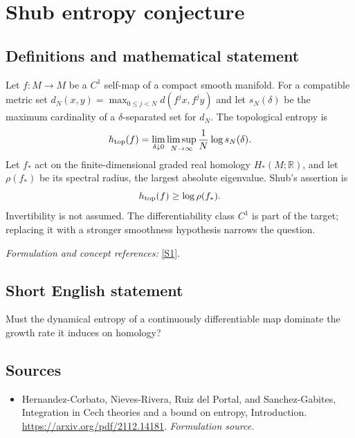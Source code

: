 \documentclass[11pt]{article}
\begin{document}
\section*{\texorpdfstring{Shub entropy conjecture}{Shub entropy conjecture}}\label{30006940}
\subsection{Definitions and mathematical statement}
Let $f:M\to M$ be a $C^1$ self-map of a compact smooth manifold. For a compatible metric set $d_N(x,y)=\max_{0\le j<N}d(f^jx,f^jy)$ and let $s_N(\delta)$ be the maximum cardinality of a $\delta$-separated set for $d_N$. The topological entropy is
\[
 h_{\rm top}(f)=\lim_{\delta\downarrow0}\limsup_{N\to\infty}
 \frac1N\log s_N(\delta).
\]
Let $f_*$ act on the finite-dimensional graded real homology $H_*(M;{\mathbb{R}})$, and let $\rho(f_*)$ be its spectral radius, the largest absolute eigenvalue. Shub's assertion is
\[
 h_{\rm top}(f)\ge\log\rho(f_*).
\]
Invertibility is not assumed. The differentiability class $C^1$ is part of the target; replacing it with a stronger smoothness hypothesis narrows the question.
\par\smallskip\textit{Formulation and concept references:} \href{https://arxiv.org/pdf/2112.14181}{[S1]}.

\subsection{Short English statement}
Must the dynamical entropy of a continuously differentiable map dominate the growth rate it induces on homology?
\subsection{Sources}
\begin{itemize}
\item[S1]Hernandez-Corbato, Nieves-Rivera, Ruiz del Portal, and Sanchez-Gabites, Integration in Cech theories and a bound on entropy, Introduction.
\url{https://arxiv.org/pdf/2112.14181}.
\textit{Formulation source.}
\end{itemize}
\end{document}
